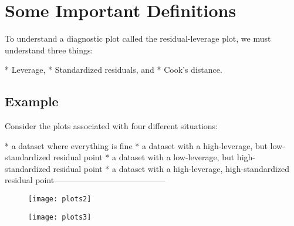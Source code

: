 
\Large

\newpage
\Large
\section{Some Important Definitions}

To understand a diagnostic plot called the residual-leverage plot, we must understand three things:


*   Leverage,
*   Standardized residuals, and
*   Cook's distance.

\newpage




\subsection*{Example}

Consider the plots associated with four different situations:

*   a dataset where everything is fine
*   a dataset with a high-leverage, but low-standardized residual point
*   a dataset with a low-leverage, but high-standardized residual point
*   a dataset with a high-leverage, high-standardized residual point-----------------------------------------
\newpage
\begin{figure}[h!]
\centering
\texttt{[image: plots2]}
\caption{}
\label{fig:plots2}
\end{figure}
\newpage
\begin{figure}[h!]
\centering
\texttt{[image: plots3]}
\caption{}
\label{fig:plots3}
\end{figure}
\newpage

